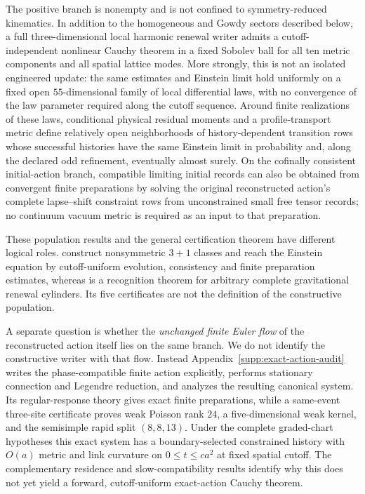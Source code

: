 \documentclass[11pt]{article}
\numberwithin{equation}{section}
\theoremstyle{definition}
\theoremstyle{remark}
\begin{document}
The positive branch is nonempty and is not confined to symmetry-reduced
kinematics.  In addition to the homogeneous and Gowdy sectors described
below, a full three-dimensional local harmonic renewal writer admits a
cutoff-independent nonlinear Cauchy theorem in a fixed Sobolev ball for all
ten metric components and all spatial lattice modes.  More strongly, this is
not an isolated engineered update: the same estimates and Einstein limit hold
uniformly on a fixed open $55$-dimensional family of local differential laws,
with no convergence of the law parameter required along the cutoff sequence.
Around finite realizations of these laws, conditional physical residual
moments and a profile-transport metric define relatively open neighborhoods
of history-dependent transition rows whose successful histories have the same
Einstein limit in probability and, along the declared odd refinement, eventually
almost surely.  On the cofinally consistent initial-action branch, compatible limiting
initial records can also be obtained from convergent finite preparations by solving the original reconstructed action's complete lapse--shift
constraint rows from unconstrained small free tensor records; no continuum
vacuum metric is required as an input to that preparation.

These population results and the general certification theorem have different
logical roles.   construct
nonsymmetric $3+1$ classes and reach the Einstein equation by cutoff-uniform
evolution, consistency and finite preparation estimates, whereas
 is a recognition theorem for arbitrary
complete gravitational renewal cylinders.  Its five certificates are not the
definition of the constructive population.

A separate question is whether the \emph{unchanged finite Euler flow} of the
reconstructed action itself lies on the same branch.  We do not identify the
constructive writer with that flow.  Instead Appendix~\ref{supp:exact-action-audit}
writes the phase-compatible finite action explicitly, performs stationary
connection and Legendre reduction, and analyzes the resulting canonical
system.  Its regular-response theory gives exact finite preparations, while a
same-event three-site certificate proves weak Poisson rank $24$, a
five-dimensional weak kernel, and the semisimple rapid split $(8,8,13)$.
Under the complete graded-chart hypotheses this exact system has a
boundary-selected constrained history with $O(a)$ metric and link curvature on
$0\le t\le ca^2$ at fixed spatial cutoff.  The complementary residence and
slow-compatibility results identify why this does not yet yield a forward,
cutoff-uniform exact-action Cauchy theorem.
\end{document}
